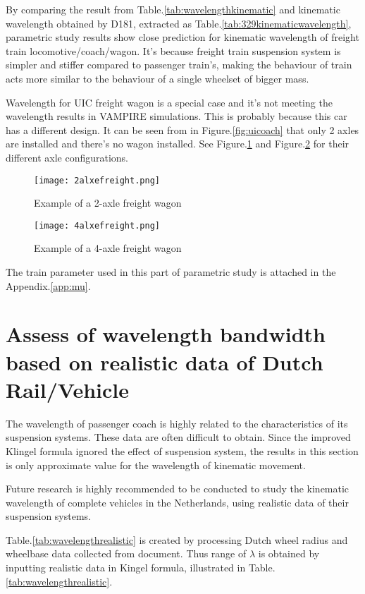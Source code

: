 By comparing the result from Table.\ref{tab:wavelengthkinematic} and kinematic wavelength obtained by D181, extracted as Table.\ref{tab:329kinematicwavelength}, parametric study results show close prediction for kinematic wavelength of freight train locomotive/coach/wagon. It's because freight train suspension system is simpler and stiffer compared to passenger train's, making the behaviour of train acts more similar to the behaviour of a single wheelset of bigger mass. 


Wavelength for UIC freight wagon is a special case and it's not meeting the wavelength results in VAMPIRE simulations. This is probably because this car has a different design. It can be seen from in Figure.\ref{fig:uicoach} that only 2 axles are installed and there's no wagon installed. See Figure.\ref{fig:2axlefreight} and Figure.\ref{fig:4axlefreight} for their different axle configurations.

\begin{figure}[h]
	\centering
	\texttt{[image: 2alxefreight.png]}
	\caption{Example of a 2-axle freight wagon}
	\label{fig:2axlefreight}
\end{figure}

\begin{figure}[h]
	\centering
	\texttt{[image: 4alxefreight.png]}
	\caption{Example of a 4-axle freight wagon}
	\label{fig:4axlefreight}
\end{figure}


The train parameter used in this part of parametric study is attached in the Appendix.\ref{app:mu}. 


\section{Assess of wavelength bandwidth based on realistic data of Dutch Rail/Vehicle}

The wavelength of passenger coach is highly related to the characteristics of its suspension systems. These data are often difficult to obtain. Since the improved Klingel formula ignored the effect of suspension system, the results in this section is only approximate value for the wavelength of kinematic movement.


Future research is highly recommended to be conducted to study the kinematic wavelength of complete vehicles in the Netherlands, using realistic data of their suspension systems.


Table.\ref{tab:wavelengthrealistic} is created by processing Dutch wheel radius and wheelbase data collected from document\citet{trainparameters}. 
Thus range of $\lambda$ is obtained by inputting realistic data in Kingel formula, illustrated in Table.\ref{tab:wavelengthrealistic}.

